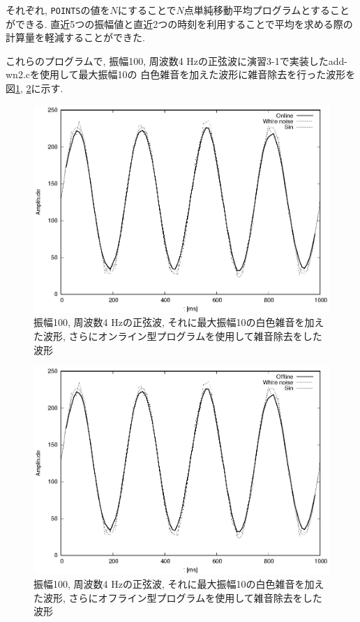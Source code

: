 \documentclass[titlepage]{jsarticle}
\begin{document}
        それぞれ, \verb|POINTS|の値を$N$にすることで$N$点単純移動平均プログラムとすることができる.
        直近5つの振幅値と直近2つの時刻を利用することで平均を求める際の計算量を軽減することができた.

        これらのプログラムで, 振幅100, 周波数4 Hzの正弦波に演習3-1で実装したadd-wn2.cを使用して最大振幅10の
        白色雑音を加えた波形に雑音除去を行った波形を図\ref{fig:mvave1}, \ref{fig:mvave2}に示す.

        \begin{figure}[h]
            \centering
            \includegraphics[width=0.8\hsize]{images/mvave5-1.eps}
            \caption{振幅100, 周波数4 Hzの正弦波, それに最大振幅10の白色雑音を加えた波形, さらにオンライン型プログラムを使用して雑音除去をした波形}
            \label{fig:mvave1}
        \end{figure}

        \begin{figure}[h]
            \centering
            \includegraphics[width=0.8\hsize]{images/mvave5-2.eps}
            \caption{振幅100, 周波数4 Hzの正弦波, それに最大振幅10の白色雑音を加えた波形, さらにオフライン型プログラムを使用して雑音除去をした波形}
            \label{fig:mvave2}
        \end{figure}
\end{document}
